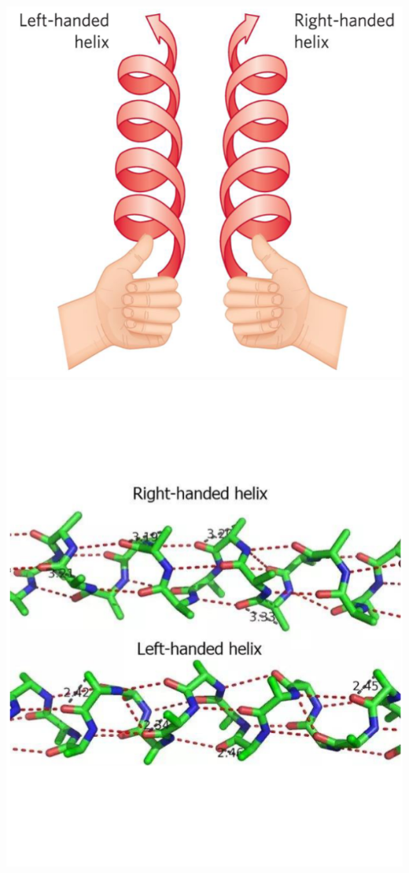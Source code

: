 \documentclass[10pt]{article}
\begin{document}
\begin{center}
    \includegraphics[scale=0.4]{L2_3.png}
    \includegraphics[scale=0.4]{L2_4.png}
\end{center}
\end{document}

